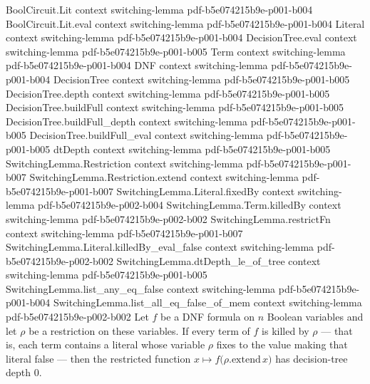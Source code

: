 \begin{lemma}
\label{SwitchingLemma.killedAll_implies_dtDepth_zero}
\leanok
{}
\proofstep
  {BoolCircuit.Lit}
  {context}
  {switching-lemma}
  {pdf-b5e074215b9e-p001-b004}
\proofstep
  {BoolCircuit.Lit.eval}
  {context}
  {switching-lemma}
  {pdf-b5e074215b9e-p001-b004}
\proofstep
  {Literal}
  {context}
  {switching-lemma}
  {pdf-b5e074215b9e-p001-b004}
\proofstep
  {DecisionTree.eval}
  {context}
  {switching-lemma}
  {pdf-b5e074215b9e-p001-b005}
\proofstep
  {Term}
  {context}
  {switching-lemma}
  {pdf-b5e074215b9e-p001-b004}
\proofstep
  {DNF}
  {context}
  {switching-lemma}
  {pdf-b5e074215b9e-p001-b004}
\proofstep
  {DecisionTree}
  {context}
  {switching-lemma}
  {pdf-b5e074215b9e-p001-b005}
\proofstep
  {DecisionTree.depth}
  {context}
  {switching-lemma}
  {pdf-b5e074215b9e-p001-b005}
\proofstep
  {DecisionTree.buildFull}
  {context}
  {switching-lemma}
  {pdf-b5e074215b9e-p001-b005}
\proofstep
  {DecisionTree.buildFull_depth}
  {context}
  {switching-lemma}
  {pdf-b5e074215b9e-p001-b005}
\proofstep
  {DecisionTree.buildFull_eval}
  {context}
  {switching-lemma}
  {pdf-b5e074215b9e-p001-b005}
\proofstep
  {dtDepth}
  {context}
  {switching-lemma}
  {pdf-b5e074215b9e-p001-b005}
\proofstep
  {SwitchingLemma.Restriction}
  {context}
  {switching-lemma}
  {pdf-b5e074215b9e-p001-b007}
\proofstep
  {SwitchingLemma.Restriction.extend}
  {context}
  {switching-lemma}
  {pdf-b5e074215b9e-p001-b007}
\proofstep
  {SwitchingLemma.Literal.fixedBy}
  {context}
  {switching-lemma}
  {pdf-b5e074215b9e-p002-b004}
\proofstep
  {SwitchingLemma.Term.killedBy}
  {context}
  {switching-lemma}
  {pdf-b5e074215b9e-p002-b002}
\proofstep
  {SwitchingLemma.restrictFn}
  {context}
  {switching-lemma}
  {pdf-b5e074215b9e-p001-b007}
\proofstep
  {SwitchingLemma.Literal.killedBy_eval_false}
  {context}
  {switching-lemma}
  {pdf-b5e074215b9e-p002-b002}
\proofstep
  {SwitchingLemma.dtDepth_le_of_tree}
  {context}
  {switching-lemma}
  {pdf-b5e074215b9e-p001-b005}
\proofstep
  {SwitchingLemma.list_any_eq_false}
  {context}
  {switching-lemma}
  {pdf-b5e074215b9e-p001-b004}
\proofstep
  {SwitchingLemma.list_all_eq_false_of_mem}
  {context}
  {switching-lemma}
  {pdf-b5e074215b9e-p002-b002}
Let $f$ be a DNF formula on $n$ Boolean variables and let $\rho$ be a restriction on
these variables. If every term of $f$ is killed by $\rho$ — that is, each term contains
a literal whose variable $\rho$ fixes to the value making that literal false — then the
restricted function $x \mapsto f\bigl(\rho.\mathrm{extend}\,x\bigr)$ has decision-tree
depth $0$.
\end{lemma}

